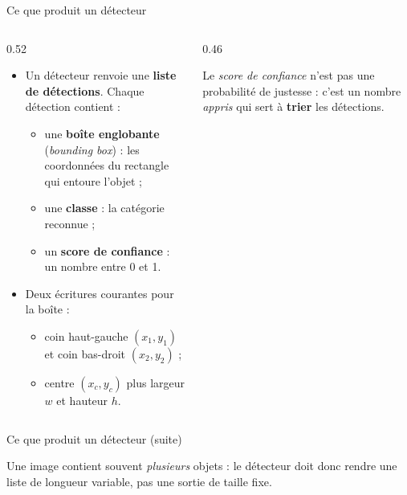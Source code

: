 \begin{frame}{Ce que produit un détecteur}
\begin{columns}[t]
\begin{column}{0.52\textwidth}
\begin{itemize}
  \item Un détecteur renvoie une \textbf{liste de détections}. Chaque détection
  contient :
  \begin{itemize}
    \item une \textbf{boîte englobante} (\emph{bounding box}) : les coordonnées
    du rectangle qui entoure l'objet ;
    \item une \textbf{classe} : la catégorie reconnue ;
    \item un \textbf{score de confiance} : un nombre entre 0 et 1.
  \end{itemize}
  \item Deux écritures courantes pour la boîte :
  \begin{itemize}
    \item coin haut-gauche $(x_1, y_1)$ et coin bas-droit $(x_2, y_2)$ ;
    \item centre $(x_c, y_c)$ plus largeur $w$ et hauteur $h$.
  \end{itemize}
\end{itemize}
\end{column}
\begin{column}{0.46\textwidth}
\begin{ebox}
\medskip

Le \emph{score de confiance} n'est pas une probabilité de justesse : c'est un
nombre \emph{appris} qui sert à \textbf{trier} les détections.
\end{ebox}

\end{column}
\end{columns}
\end{frame}
\begin{frame}{Ce que produit un détecteur (suite)}
\begin{wbox}
Une image contient souvent \emph{plusieurs} objets : le détecteur doit donc
rendre une liste de longueur variable, pas une sortie de taille fixe.
\end{wbox}
\end{frame}

